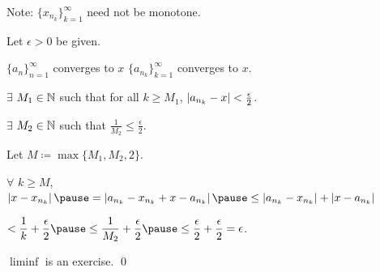 \documentclass[10pt,aspectratio=169]{beamer}
\begin{document}
\begin{frame}

Note: $\{ x_{n_k} \}_{k=1}^\infty$ need not be monotone.

\pause
\medskip

Let $\epsilon > 0$ be given.

\pause
\medskip

$\{ a_n \}_{n=1}^\infty$ converges to $x$ \wthus $\{ a_{n_k} \}_{k=1}^\infty$ converges to $x$.

\pause
\medskip

$\exists$ $M_1 \in {\mathbb{N}}$ such that for all $k \geq M_1$, \quad
$\left\lvert {a_{n_k} - x} \right\rvert < \frac{\epsilon}{2}$.

\pause
\medskip

$\exists$ $M_2 \in {\mathbb{N}}$ such that
\quad $\displaystyle \frac{1}{M_2} \leq \frac{\epsilon}{2}$.

\pause
\medskip

Let $M \coloneqq \max \{M_1 , M_2 , 2 \}$.

\pause
\medskip

$\forall$ $k \geq M$,
\qquad
$\displaystyle
\abs{x- x_{n_k}}
\pause
=
\abs{a_{n_k} - x_{n_k} + x - a_{n_k}}
\pause
\leq
\abs{a_{n_k} - x_{n_k}} + \abs{x - a_{n_k}}$

\pause
\medskip

\qquad\qquad\qquad\qquad\qquad\qquad
$\displaystyle
< \frac{1}{k} + \frac{\epsilon}{2}
\pause
\leq \frac{1}{M_2} + \frac{\epsilon}{2}
\pause
\leq \frac{\epsilon}{2} +
\frac{\epsilon}{2} = \epsilon$.

\pause
\medskip

$\liminf$ is an exercise.
\qed

\end{frame}
\end{document}
